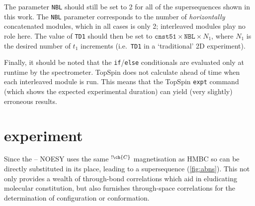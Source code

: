 \documentclass[a4paper,12pt]{article}
\newcommand{\proton}{\ch{^{1}H}}
\newcommand{\carbon}{\ch{^{13}C}}
\newcommand{\magnnot}[1]{\ch{^1H}$^{!#1}$}
\begin{document}
\begin{refsection}
The parameter \texttt{NBL} should still be set to 2 for all of the supersequences shown in this work.
The \texttt{NBL} parameter corresponds to the number of \textit{horizontally} concatenated modules, which in all cases is only 2; interleaved modules play no role here.
The value of \texttt{TD1} should then be set to $\texttt{cnst51} \times \texttt{NBL} \times N_1$, where $N_1$ is the desired number of $t_1$ increments (i.e.\ \texttt{TD1} in a `traditional' 2D experiment).

Finally, it should be noted that the \texttt{if}/\texttt{else} conditionals are evaluated only at runtime by the spectrometer.
TopSpin does not calculate ahead of time when each interleaved module is run.
This means that the TopSpin \texttt{expt} command (which shows the expected experimental duration) can yield (very slightly) erroneous results.

\clearpage

\section{\texorpdfstring{}{NOAH-4 ABnNS} experiment}

Since the \proton{}--\proton{} NOESY uses the same \magnnot{\ch{C}} magnetisation as \carbon{} HMBC so can be directly substituted in its place, leading to a  supersequence (\cref{fig:abns}).
This not only provides a wealth of through-bond correlations which aid in eludicating molecular constitution, but also furnishes through-space correlations for the determination of configuration or conformation.


\end{refsection}
\end{document}
